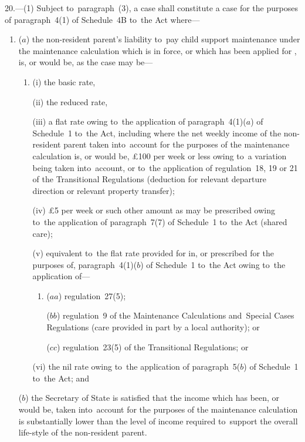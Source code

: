 \documentclass[12pt,a4paper]{article}
\begin{document}
20.---(1)  Subject to~paragraph~(3), a case shall constitute a case for the purposes of paragraph~4(1) of Schedule~4B to~the Act where—
\begin{enumerate}\item[]
($a$) the non-resident parent’s liability to~pay child support maintenance under the maintenance calculation which is in force, or which has been applied for%
, is, or would be, as the case may be—
\begin{enumerate}\item[]
(i) the basic rate,

(ii) the reduced rate,

(iii) a flat rate owing to~the application of paragraph~4(1)($a$)  of Schedule~1 to~the Act, including where the net weekly income of the non-resident parent taken into~account for the purposes of the maintenance calculation is, or would be, £100 per week or less owing to~a variation being taken into~account, or to~the application of regulation~18, 19 or 21 of the Transitional Regulations (deduction for relevant departure direction or relevant property transfer);

(iv) £5 per week or such other amount as may be prescribed owing to~the application of paragraph~7(7) of Schedule~1 to~the Act (shared care);

(v) equivalent to~the flat rate provided for in, or prescribed for the purposes of, paragraph~4(1)($b$)  of Schedule~1 to~the Act owing to~the application of—
\begin{enumerate}\item[]
($aa$) regulation~27(5);

($bb$) regulation~9 of the Maintenance Calculations and~Special Cases Regulations (care provided in part by a local authority); or

($cc$) regulation~23(5) of the Transitional Regulations; or
\end{enumerate}

(vi) the nil rate owing to~the application of paragraph~5($b$)  of Schedule~1 to~the Act; and
\end{enumerate}

($b$) the Secretary of State is satisfied that the income which has been, or would be, taken into~account for the purposes of the maintenance calculation is substantially lower than the level of income required to~support the overall life-style of the non-resident parent.
\end{enumerate}
\end{document}
